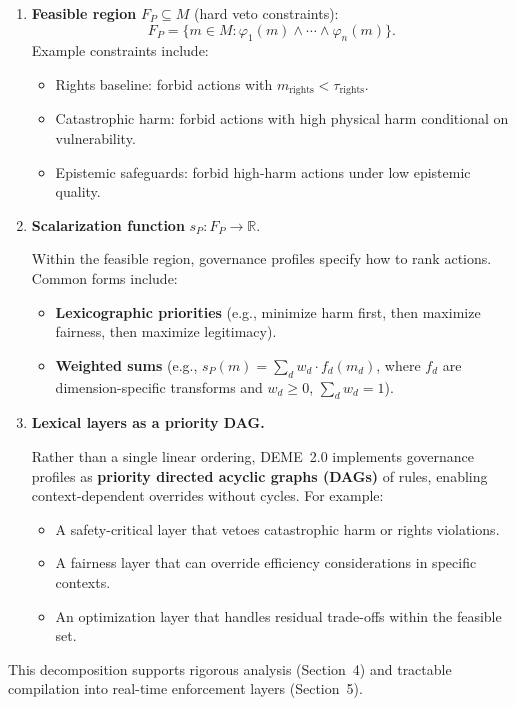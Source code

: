 \documentclass[11pt]{article}
\begin{document}
\begin{enumerate}
  \item \textbf{Feasible region} $F_P \subseteq M$ (hard veto constraints):
  \[
    F_P = \{m \in M : \varphi_1(m) \land \cdots \land \varphi_n(m)\}.
  \]
  Example constraints include:
  \begin{itemize}[label=$\circ$]
    \item Rights baseline: forbid actions with $m_{\mathrm{rights}} < \tau_{\mathrm{rights}}$.
    \item Catastrophic harm: forbid actions with high physical harm conditional on vulnerability.
    \item Epistemic safeguards: forbid high-harm actions under low epistemic quality.
  \end{itemize}

  \item \textbf{Scalarization function} $s_P \colon F_P \to \mathbb{R}$.

  Within the feasible region, governance profiles specify how to rank actions. Common forms include:
  \begin{itemize}[label=$\circ$]
    \item \textbf{Lexicographic priorities} (e.g., minimize harm first, then maximize fairness, then maximize legitimacy).
    \item \textbf{Weighted sums} (e.g., $s_P(m) = \sum_d w_d \cdot f_d(m_d)$, where $f_d$ are dimension-specific transforms and $w_d \ge 0$, $\sum_d w_d = 1$).
  \end{itemize}

  \item \textbf{Lexical layers as a priority DAG.}

  Rather than a single linear ordering, DEME~2.0 implements governance profiles as \textbf{priority directed acyclic graphs (DAGs)} of rules, enabling context-dependent overrides without cycles. For example:
  \begin{itemize}[label=$\circ$]
    \item A safety-critical layer that vetoes catastrophic harm or rights violations.
    \item A fairness layer that can override efficiency considerations in specific contexts.
    \item An optimization layer that handles residual trade-offs within the feasible set.
  \end{itemize}
\end{enumerate}

This decomposition supports rigorous analysis (Section~4) and tractable compilation into real-time enforcement layers (Section~5).
\end{document}

